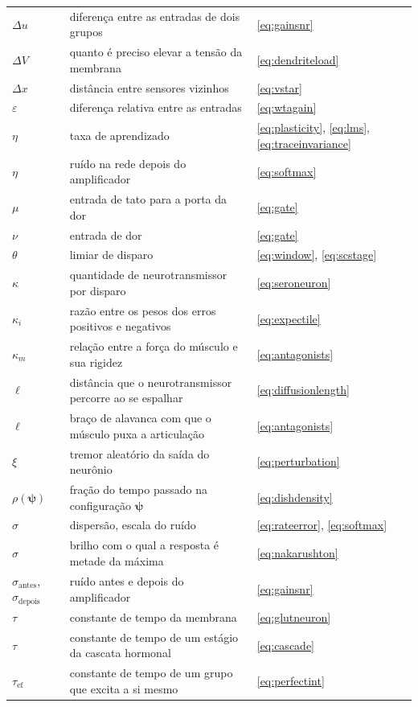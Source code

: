 \begin{center}
\begin{longtable}{>{\raggedright}p{2.0cm}>{\raggedright}p{9.6cm}>{\raggedright\arraybackslash}p{2.4cm}}
$\Delta u$ & diferença entre as entradas de dois grupos & \eqref{eq:gainsnr} \\
$\Delta V$ & quanto é preciso elevar a tensão da membrana & \eqref{eq:dendriteload} \\
$\Delta x$ & distância entre sensores vizinhos & \eqref{eq:vstar} \\
$\varepsilon$ & diferença relativa entre as entradas & \eqref{eq:wtagain} \\
$\eta$ & taxa de aprendizado & \eqref{eq:plasticity}, \eqref{eq:lms}, \eqref{eq:traceinvariance} \\
$\eta$ & ruído na rede depois do amplificador & \eqref{eq:softmax} \\
$\mu$ & entrada de tato para a porta da dor & \eqref{eq:gate} \\
$\nu$ & entrada de dor & \eqref{eq:gate} \\
$\theta$ & limiar de disparo & \eqref{eq:window}, \eqref{eq:scstage} \\
$\kappa$ & quantidade de neurotransmissor por disparo & \eqref{eq:seroneuron} \\
$\kappa_i$ & razão entre os pesos dos erros positivos e negativos & \eqref{eq:expectile} \\
$\kappa_m$ & relação entre a força do músculo e sua rigidez & \eqref{eq:antagonists} \\
$\ell$ & distância que o neurotransmissor percorre ao se espalhar & \eqref{eq:diffusionlength} \\
$\ell$ & braço de alavanca com que o músculo puxa a articulação & \eqref{eq:antagonists} \\
$\xi$ & tremor aleatório da saída do neurônio & \eqref{eq:perturbation} \\
$\rho(\boldsymbol\psi)$ & fração do tempo passado na configuração $\boldsymbol\psi$ & \eqref{eq:dishdensity} \\
$\sigma$ & dispersão, escala do ruído & \eqref{eq:rateerror}, \eqref{eq:softmax} \\
$\sigma$ & brilho com o qual a resposta é metade da máxima & \eqref{eq:nakarushton} \\
$\sigma_{\text{antes}}$, $\sigma_{\text{depois}}$ & ruído antes e depois do amplificador & \eqref{eq:gainsnr} \\
$\tau$ & constante de tempo da membrana & \eqref{eq:glutneuron} \\
$\tau$ & constante de tempo de um estágio da cascata hormonal & \eqref{eq:cascade} \\
$\tau_{\text{ef}}$ & constante de tempo de um grupo que excita a si mesmo & \eqref{eq:perfectint} \\

\end{longtable}
\end{center}
